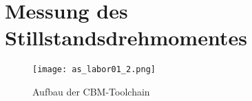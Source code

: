 \section{Messung des Stillstandsdrehmomentes}

\begin{figure}[htp]
 \centering
 \texttt{[image: as\_labor01\_2.png]}
 \caption{Aufbau der CBM-Toolchain}
 \label{fig:Plot Aufgabe 2}
\end{figure}


